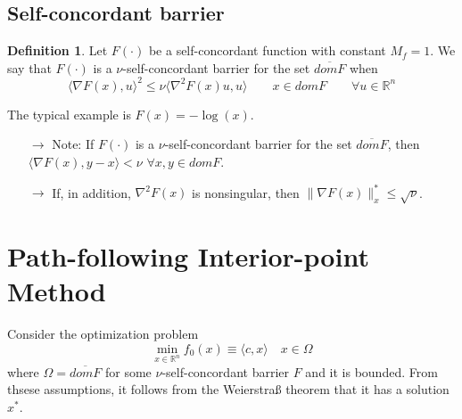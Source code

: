 \documentclass[12pt, openany]{report}
\newcommand{\R}{\mathbb{R}}
\theoremstyle{definition}
\newtheorem{definition}[thm]{Definition}
\begin{document}
\subsection{Self-concordant barrier}
\begin{definition}
	Let $F(\cdot)$ be a self-concordant function with constant $M_f=1$. We say that $F(\cdot)$ is a $\nu$-self-concordant barrier for the set $\overline{dom F}$ when 
	\begin{equation}
		\langle \nabla F(x),u\rangle^2 \le \nu \langle \nabla^2F(x)u,u\rangle \qquad x\in domF\qquad \forall u\in \R^n
	\end{equation}
\end{definition}
The typical example is $F(x)=-\log(x)$. 
\begin{itemize}
	\item [$\to$] Note: If $F(\cdot)$ is a $\nu$-self-concordant barrier for the set $\overline{dom F}$, then $\langle \nabla F(x),y-x\rangle < \nu$ $\forall x,y \in dom F$.
	\item [$\to$] If, in addition, $\nabla^2F(x)$ is nonsingular, then $\|\nabla F(x)\|_x^*\le \sqrt{\nu}$.
\end{itemize}
\section{Path-following Interior-point Method}
Consider the optimization problem 
\begin{equation}\label{eq:problem}
	\min_{x\in \R^n} f_0(x)\equiv \langle c,x\rangle \quad x\in \Omega
\end{equation}
where $\Omega = \overline{domF}$ for some $\nu$-self-concordant barrier $F$ and it is bounded. From thsese assumptions, it follows from the Weierstraß theorem that it has a solution $x^*$. \\
\end{document}
